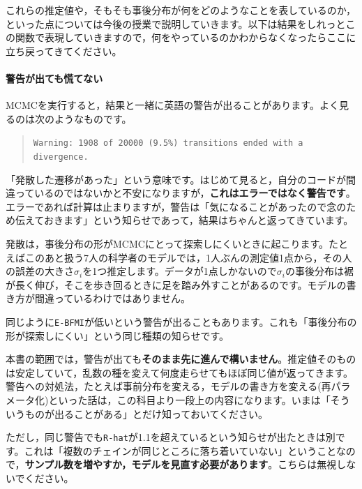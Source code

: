 \documentclass{ltjsbook}
\begin{document}
これらの推定値や，そもそも事後分布が何をどのようなことを表しているのか，といった点については今後の授業で説明していきます。以下は結果をしれっとこの関数で表現していきますので，何をやっているのかわからなくなったらここに立ち戻ってきてください。

\paragraph{警告が出ても慌てない}
MCMCを実行すると，結果と一緒に英語の警告が出ることがあります。よく見るのは次のようなものです。

\begin{quote}
	\texttt{Warning: 1908 of 20000 (9.5\%) transitions ended with a divergence.}
\end{quote}

「発散した遷移があった」という意味です。はじめて見ると，自分のコードが間違っているのではないかと不安になりますが，\textbf{これはエラーではなく警告です}。エラーであれば計算は止まりますが，警告は「気になることがあったので念のため伝えておきます」という知らせであって，結果はちゃんと返ってきています。

発散は，事後分布の形がMCMCにとって探索しにくいときに起こります。たとえばこのあと扱う7人の科学者のモデルでは，1人ぶんの測定値1点から，その人の誤差の大きさ$\sigma_i$を1つ推定します。データが1点しかないので$\sigma_i$の事後分布は裾が長く伸び，そこを歩き回るときに足を踏み外すことがあるのです。モデルの書き方が間違っているわけではありません。

同じように\verb|E-BFMI|が低いという警告が出ることもあります。これも「事後分布の形が探索しにくい」という同じ種類の知らせです。

本書の範囲では，警告が出ても\textbf{そのまま先に進んで構いません}。推定値そのものは安定していて，乱数の種を変えて何度走らせてもほぼ同じ値が返ってきます。警告への対処法，たとえば事前分布を変える，モデルの書き方を変える(再パラメータ化)といった話は，この科目より一段上の内容になります。いまは「そういうものが出ることがある」とだけ知っておいてください。

ただし，同じ警告でも\verb|R-hat|が1.1を超えているという知らせが出たときは別です。これは「複数のチェインが同じところに落ち着いていない」ということなので，\textbf{サンプル数を増やすか，モデルを見直す必要があります}。こちらは無視しないでください。
\end{document}
